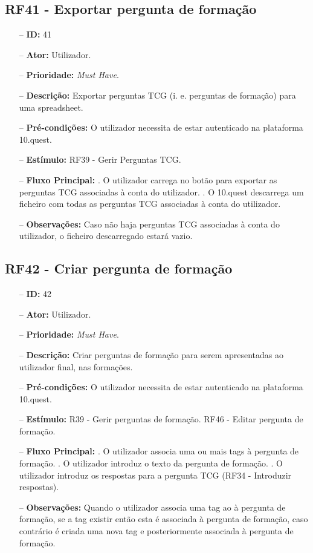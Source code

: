 \subsection{RF41 - Exportar pergunta de formação}
\begin{itemize}
	\item[--] \textbf{ID:} 41
	\item[--]  \textbf{Ator:} Utilizador.
	\item[--]  \textbf{Prioridade:} \textit{Must Have}.
	\item[--]  \textbf{Descrição:} Exportar perguntas TCG (i. e. perguntas de formação) para uma spreadsheet.
	\item[--]  \textbf{Pré-condições:} O utilizador necessita de estar autenticado na plataforma 10.quest.
	\item[--]  \textbf{Estímulo:} RF39 - Gerir Perguntas TCG.
	\item[--]  \textbf{Fluxo Principal:} 
	. O utilizador carrega no botão para exportar as perguntas TCG associadas à conta do utilizador.
	. O 10.quest descarrega um ficheiro com todas as perguntas TCG associadas à conta do utilizador.
	\item[--]  \textbf{Observações:} Caso não haja perguntas TCG associadas à conta do utilizador, o ficheiro descarregado estará vazio.
\end{itemize}
\newpage

\subsection{RF42 - Criar pergunta de formação}
\begin{itemize}
	\item[--] \textbf{ID:} 42
	\item[--]  \textbf{Ator:} Utilizador.
	\item[--]  \textbf{Prioridade:} \textit{Must Have}.
	\item[--]  \textbf{Descrição:} Criar perguntas de formação para serem apresentadas ao utilizador final, nas formações.
	\item[--]  \textbf{Pré-condições:} O utilizador necessita de estar autenticado na plataforma 10.quest.
	\item[--]  \textbf{Estímulo:}  
	\subitem R39 - Gerir perguntas de formação.
	\subitem RF46 - Editar pergunta de formação.
	\item[--]  \textbf{Fluxo Principal:} 
	. O utilizador associa uma ou mais tags à pergunta de formação.
	. O utilizador introduz o texto da pergunta de formação.
	. O utilizador introduz os respostas para a pergunta TCG (RF34 - Introduzir respostas).
	\item[--]  \textbf{Observações:} 
	Quando o utilizador associa uma tag ao à pergunta de formação, se a tag existir então esta é associada à pergunta de formação, caso contrário é criada uma nova tag e posteriormente associada à pergunta de formação.
\end{itemize}
\newpage

